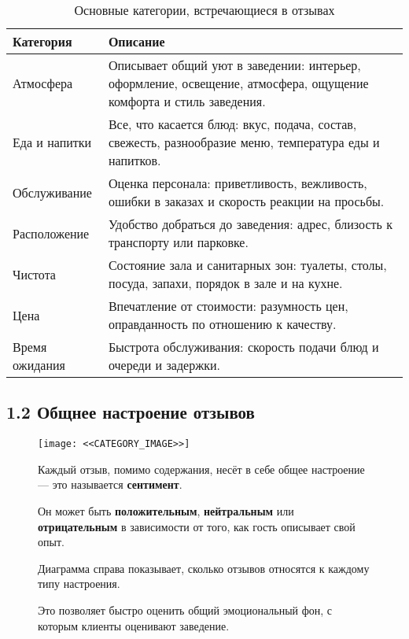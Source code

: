 \documentclass[a4paper,12pt]{extarticle}
\begin{document}
\begin{table}[H]
\centering
\caption*{Основные категории, встречающиеся в отзывах}
\renewcommand{\arraystretch}{1.4}
\begin{tabular}{p{3.5cm}p{12cm}}
\toprule
\textbf{Категория} & \textbf{Описание} \\
\midrule
Атмосфера & Описывает общий уют в заведении: интерьер, оформление, освещение, атмосфера, ощущение комфорта и стиль заведения. \\
Еда и напитки & Все, что касается блюд: вкус, подача, состав, свежесть, разнообразие меню, температура еды и напитков. \\
Обслуживание & Оценка персонала: приветливость, вежливость, ошибки в заказах и скорость реакции на просьбы. \\
Расположение & Удобство добраться до заведения: адрес, близость к транспорту или парковке. \\
Чистота & Состояние зала и санитарных зон: туалеты, столы, посуда, запахи, порядок в зале и на кухне. \\
Цена & Впечатление от стоимости: разумность цен, оправданность по отношению к качеству. \\
Время ожидания & Быстрота обслуживания: скорость подачи блюд и очереди и задержки. \\
\bottomrule
\end{tabular}
\end{table}



\subsection*{1.2 Общнее настроение отзывов}

\begin{figure}[H]
    \centering
    \begin{minipage}{0.48\textwidth}
        \texttt{[image: <<CATEGORY\_IMAGE>>]}
    \end{minipage}%
    \hfill
    \begin{minipage}{0.48\textwidth}
        \small
        Каждый отзыв, помимо содержания, несёт в себе общее настроение — это называется \textbf{сентимент}.
        \vspace{0.5em}

        Он может быть \textbf{положительным}, \textbf{нейтральным} или \textbf{отрицательным} в зависимости от того, как гость описывает свой опыт.

        \vspace{0.5em}
        Диаграмма справа показывает, сколько отзывов относятся к каждому типу настроения.

        \vspace{0.5em}
        Это позволяет быстро оценить общий эмоциональный фон, с которым клиенты оценивают заведение.
    \end{minipage}
\end{figure}
\end{document}
